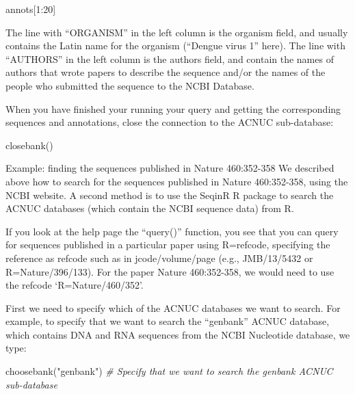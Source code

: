 \documentclass[
]{book}
\newenvironment{Shaded}{\begin{snugshade}}{\end{snugshade}}
\newcommand{\CommentTok}[1]{\textcolor[rgb]{0.56,0.35,0.01}{\textit{#1}}}
\newcommand{\DecValTok}[1]{\textcolor[rgb]{0.00,0.00,0.81}{#1}}
\newcommand{\FunctionTok}[1]{\textcolor[rgb]{0.00,0.00,0.00}{#1}}
\newcommand{\NormalTok}[1]{#1}
\newcommand{\SpecialCharTok}[1]{\textcolor[rgb]{0.00,0.00,0.00}{#1}}
\newcommand{\StringTok}[1]{\textcolor[rgb]{0.31,0.60,0.02}{#1}}
\begin{document}
\begin{Shaded}
\begin{Highlighting}[]
\NormalTok{annots[}\DecValTok{1}\SpecialCharTok{:}\DecValTok{20}\NormalTok{]}
\end{Highlighting}
\end{Shaded}

The line with ``ORGANISM'' in the left column is the organism field, and usually contains the Latin name for the organism (``Dengue virus 1'' here). The line with ``AUTHORS'' in the left column is the authors field, and contain the names of authors that wrote papers to describe the sequence and/or the names of the people who submitted the sequence to the NCBI Database.

When you have finished your running your query and getting the corresponding sequences and annotations, close the connection to the ACNUC sub-database:

\begin{Shaded}
\begin{Highlighting}[]
\FunctionTok{closebank}\NormalTok{()}
\end{Highlighting}
\end{Shaded}

Example: finding the sequences published in Nature 460:352-358
We described above how to search for the sequences published in Nature 460:352-358, using the NCBI website. A second method is to use the SeqinR R package to search the ACNUC databases (which contain the NCBI sequence data) from R.

If you look at the help page the ``query()'' function, you see that you can query for sequences published in a particular paper using R=refcode, specifying the reference as refcode such as in jcode/volume/page (e.g., JMB/13/5432 or R=Nature/396/133). For the paper Nature 460:352-358, we would need to use the refcode `R=Nature/460/352'.

First we need to specify which of the ACNUC databases we want to search. For example, to specify that we want to search the ``genbank'' ACNUC database, which contains DNA and RNA sequences from the NCBI Nucleotide database, we type:

\begin{Shaded}
\begin{Highlighting}[]
\FunctionTok{choosebank}\NormalTok{(}\StringTok{"genbank"}\NormalTok{) }\CommentTok{\# Specify that we want to search the \textquotesingle{}genbank\textquotesingle{} ACNUC sub{-}database}
\end{Highlighting}
\end{Shaded}
\end{document}
